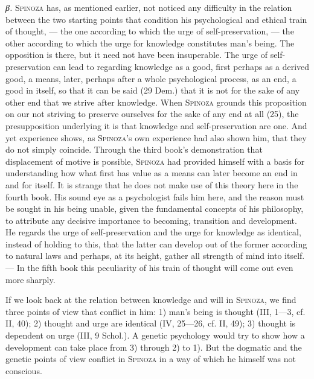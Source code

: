 \documentclass[12pt]{article}
\newcommand{\opage}[1]{\marginnote{\footnotesize\textit{[#1]}}}
\begin{document}
\textit{β.} \textsc{Spinoza} has, as mentioned earlier, not noticed any difficulty in the relation
between the two starting points that condition his psychological and ethical train of thought,
--- the one according to which the urge of self-preservation, --- the other according to which the
urge for knowledge constitutes man's being. %
The opposition is there, but it need not have been insuperable. The urge of self-preservation can
lead to regarding knowledge as a good, first perhaps as a derived good, a means, later, perhaps
after a whole psychological process, as an end, a good in itself, so that it can be said (29
Dem.) that it is not for the sake of any other end that we strive after knowledge. When
\textsc{Spinoza} grounds this proposition on our not striving to preserve ourselves for the sake of
any end at all (25), the presupposition underlying it is that knowledge and self-preservation are
one. And yet experience shows, as \textsc{Spinoza}'s own experience had also shown him, that they
do not simply coincide. Through the third book's demonstration that displacement of motive is
possible, \textsc{Spinoza} had provided himself with a basis for understanding how what first has
value as a means can later become an end in and for itself. It is strange that he does not make
use of this theory here in the fourth book. His sound eye as a psychologist fails him here, and the
reason must be sought in his being unable, given the fundamental concepts of his philosophy, to
attribute any decisive importance to becoming, transition and development. He regards the urge of
self-preservation and the urge for knowledge as identical, instead of holding to this, that the
latter can develop out of the former according to natural laws and perhaps, at its height, gather
all strength of mind into itself. %
--- In the fifth book this peculiarity of his train of thought will come out even more sharply.

If we look back at the relation between knowledge and will in \textsc{Spinoza}, we find three
points of view that conflict in him: 1) man's being is thought (III, 1---3, cf. II, 40); 2) thought
and urge are identical (IV, 25---26, cf. II, 49); 3) thought is dependent on urge (III, 9 Schol.).
A genetic psychology would try to \opage{77}show how a development can take place from 3) through
2) to 1). But the dogmatic and the genetic points of view conflict in \textsc{Spinoza} in a way of
which he himself was not conscious.
\end{document}
